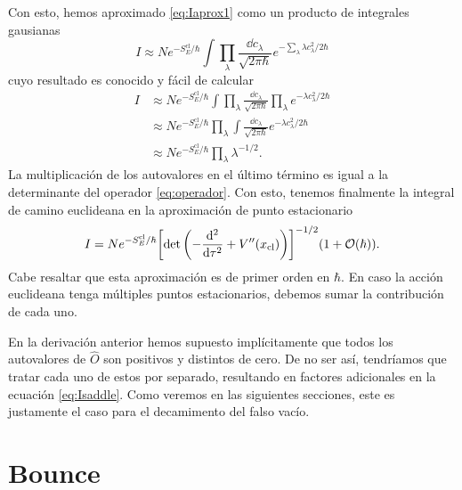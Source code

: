 Con esto, hemos aproximado \eqref{eq:Iaprox1} como un producto de integrales gausianas
\begin{equation}
I \approx N e^{-S_E^{\textrm{cl}}/\hbar} \int \prod_\lambda \frac{\dd{c_\lambda}}{\sqrt{2\pi \hbar}} e^{-\sum_\lambda \lambda c_\lambda^2/2\hbar}
\end{equation}
cuyo resultado es conocido y fácil de calcular
\begin{align}
I &\approx N e^{-S_E^{\textrm{cl}}/\hbar} \int \prod_\lambda \frac{\dd{c_\lambda}}{\sqrt{2\pi \hbar}} \prod_\lambda e^{-\lambda c_\lambda^2/2\hbar} \\
&\approx N e^{-S_E^{\textrm{cl}}/\hbar} \prod_\lambda \int  \frac{\dd{c_\lambda}}{\sqrt{2\pi \hbar}} e^{-\lambda c_\lambda^2/2\hbar} \\
&\approx N e^{-S_E^{\textrm{cl}}/\hbar} \prod_\lambda \lambda^{ -1/2}.
\end{align}
La multiplicación de los autovalores en el último término es igual a la determinante del operador \eqref{eq:operador}. Con esto, tenemos finalmente la integral de camino euclideana en la aproximación de punto estacionario
\begin{equation}\label{eq:Isaddle}
I = Ne^{-S_E^{\textrm{cl}} / \hbar} \qty[ \det\left(-\dv[2]{\tau} + V''\qty(x_{\textrm{cl}}) \right) ]^{-1/2} \qty(1 + \order{\hbar}).
\end{equation}
Cabe resaltar que esta aproximación es de primer orden en $\hbar$. En caso la acción euclideana tenga múltiples puntos estacionarios, debemos sumar la contribución de cada uno.


En la derivación anterior hemos supuesto implícitamente que todos los autovalores de $\hat{O}$ son positivos y distintos de cero. De no ser así, tendríamos que tratar cada uno de estos por separado, resultando en factores adicionales en la ecuación \eqref{eq:Isaddle}. Como veremos en las siguientes secciones, este es justamente el caso para el decamimento del falso vacío.

\section{Bounce}


